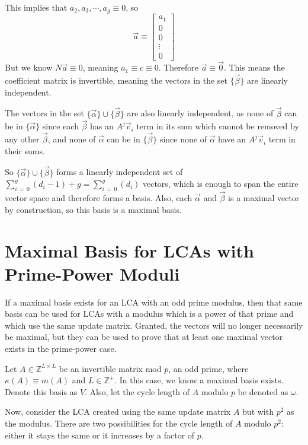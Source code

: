 \documentclass[a4paper, reqno, 12pt]{amsart}
\begin{document}
		This implies that $a_2, a_3, \cdots, a_g \equiv 0$, so
		\[
			\vec{a} \equiv
			\begin{bmatrix}
				a_1    \\
				0      \\
				0      \\
				\vdots \\
				0
			\end{bmatrix}
		\]
		But we know $N\vec{a} \equiv 0$, meaning $a_1 \equiv c \equiv 0$. Therefore $\vec{a} \equiv \vec{0}$. This means the coefficient
		matrix is invertible, meaning the vectors in the set $\{\vec{\beta}\}$ are linearly independent.
		
		The vectors in the set $\{\vec{\alpha}\} \cup \{\vec{\beta}\}$ are also linearly independent, as none of $\vec{\beta}$ can be in $\{\vec{\alpha}\}$ since
		each $\vec{\beta}$ has an $A^{j}\vec{v}_i$ term in its sum which cannot be removed by any other $\vec{\beta}$, and none of $\vec{\alpha}$ can be in 
		$\{\vec{\beta}\}$ since none of $\vec{\alpha}$ have an $A^{j}\vec{v}_i$ term in their sums.
		
		So $\{\vec{\alpha}\} \cup \{\vec{\beta}\}$ forms a linearly independent set of $\sum_{i\,=\,0}^{g}(d_i - 1) + g = \sum_{i\,=\,0}^{g}(d_i)$ vectors, which
		is enough to span the entire vector space and therefore forms a basis. Also, each $\vec{\alpha}$ and $\vec{\beta}$ is a maximal vector by construction, so 
		this basis is a maximal basis.
		
	\section{Maximal Basis for LCAs with Prime-Power Moduli}
		If a maximal basis exists for an LCA with an odd prime modulus, then that same basis can be used for LCAs with a modulus which is a power of that prime and
		which use the same update matrix. Granted, the vectors will no longer necessarily be maximal, but they can be used to prove that at least one maximal vector 
		exists in the prime-power case.
		
		Let $A \in \mathds{Z}^{L \times L}$ be an invertible matrix mod $p$, an odd prime, where $\kappa(A) \equiv m(A)$ and $L \in \mathds{Z}^+$. In this case,
		we know a maximal basis exists. Denote this basis as $V$. Also, let the cycle length of $A$ modulo $p$ be denoted as $\omega$.
		
		Now, consider the LCA created using the same update matrix $A$ but with $p^2$ as the modulus. There are two possibilities for the cycle length of $A$ 
		modulo $p^2$: either it stays the same or it increases by a factor of $p$.
		
\end{document}
